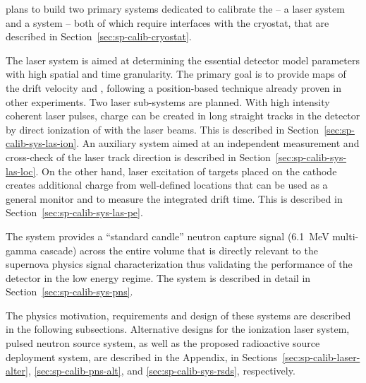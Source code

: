  plans to build two primary systems dedicated to %
calibrate the  -- a laser system
and a  system -- both of which require interfaces with the cryostat, that are described in Section~\ref{sec:sp-calib-cryostat}. 

The laser system is aimed at %
determining the essential detector model parameters with high spatial and time granularity. The primary goal is to provide maps of the drift velocity and \efield, following a position-based technique already proven in other  experiments. %
Two laser sub-systems are planned. 
With high intensity coherent laser pulses, charge can be created in long straight tracks in the detector by direct ionization of  with the laser beams. This is described in Section~\ref{sec:sp-calib-sys-las-ion}. An auxiliary system aimed at an independent measurement and cross-check of the laser track direction is described in Section~\ref{sec:sp-calib-sys-las-loc}.
On the other hand, laser excitation of targets placed on the cathode creates additional charge from well-defined locations that can be used %
as a general  monitor and to measure the integrated drift time. This is described in Section~\ref{sec:sp-calib-sys-las-pe}. 

The  system %
provides a ``standard candle'' neutron capture signal (\SI{6.1}{\MeV} multi-gamma cascade) across the entire  volume that is directly relevant to the supernova physics signal characterization thus validating the performance of the detector in the low energy regime. The  system is described in detail in Section~\ref{sec:sp-calib-sys-pns}.  

The physics motivation, requirements and design of these systems are described in the following subsections. Alternative designs
for the ionization laser system, pulsed neutron source system, as well as the proposed radioactive source deployment system, are described in the Appendix, in Sections~\ref{sec:sp-calib-laser-alter}, \ref{sec:sp-calib-pns-alt}, and \ref{sec:sp-calib-sys-rsds}, respectively.
